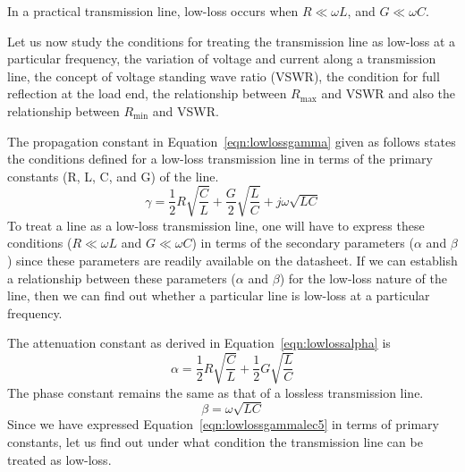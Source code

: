 In a practical transmission line, low-loss occurs when $R\ll\omega L$, and $G\ll\omega C $.

Let us now study the conditions for treating the transmission line as low-loss at a particular frequency, the variation of voltage and current along a transmission line, the concept of voltage standing wave ratio (VSWR), the condition for full reflection at the load end, the relationship between $R_\max$ and VSWR and also the relationship between $R_\min$ and VSWR.

The propagation constant in Equation~\eqref{eqn:lowlossgamma} given as follows states the conditions defined for a low-loss transmission line in terms of the primary constants (R, L, C, and G) of the line.
\begin{equation}
\gamma = \frac{1}{2}R\sqrt{\frac{C}{L}} + \frac{G}{2}\sqrt{\frac{L}{C}} +j\omega\sqrt{LC}
\label{eqn:lowlossgammalec5}
\end{equation}
To treat a line as a low-loss transmission line, one will have to express these conditions ($R\ll\omega L$ and $G\ll\omega C$) in terms of the secondary parameters ($\alpha$ and $\beta$) since these parameters are readily available on the datasheet. If we can establish a relationship between these parameters ($\alpha$ and $\beta $) for the low-loss nature of the line, then we can find out whether a particular line is low-loss at a particular frequency.

The attenuation constant as derived in Equation~\eqref{eqn:lowlossalpha} is
\begin{equation}
\alpha = \frac{1}{2}R\sqrt{\frac{C}{L}} + \frac{1}{2}G\sqrt{\frac{L}{C}}	
\label{eqn:lowlossalphalec5}
\end{equation}
The phase constant remains the same as that of a lossless transmission line.
\begin{equation}
\beta = \omega\sqrt{LC}
\end{equation}
Since we have expressed Equation~\eqref{eqn:lowlossgammalec5} in terms of primary constants, let us find out under what condition the transmission line can be treated as low-loss.

